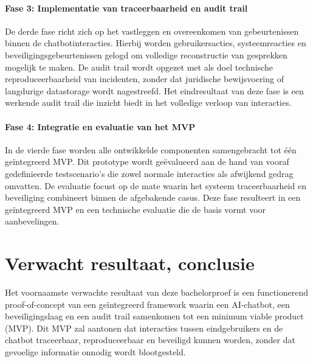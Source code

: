 \paragraph{Fase 3: Implementatie van traceerbaarheid en audit trail}
De derde fase richt zich op het vastleggen en overeenkomen van gebeurtenissen binnen de chatbotinteracties. Hierbij worden gebruikersacties, systeemreacties en beveiligingsgebeurtenissen gelogd om volledige reconstructie van gesprekken mogelijk te maken. De audit trail wordt opgezet met als doel technische reproduceerbaarheid van incidenten, zonder dat juridische bewijsvoering of langdurige datastorage wordt nagestreefd. Het eindresultaat van deze fase is een werkende audit trail die inzicht biedt in het volledige verloop van interacties.

\paragraph{Fase 4: Integratie en evaluatie van het MVP}
In de vierde fase worden alle ontwikkelde componenten samengebracht tot één geïntegreerd MVP. Dit prototype wordt geëvalueerd aan de hand van vooraf gedefinieerde testscenario’s die zowel normale interacties als afwijkend gedrag omvatten. De evaluatie focust op de mate waarin het systeem traceerbaarheid en beveiliging combineert binnen de afgebakende casus. Deze fase resulteert in een geïntegreerd MVP en een technische evaluatie die de basis vormt voor aanbevelingen.


\section{Verwacht resultaat, conclusie}%
\label{sec:verwachte_resultaten}

\noindent Het voornaamste verwachte resultaat van deze bachelorproef is een functionerend proof-of-concept van een geïntegreerd framework waarin een AI-chatbot, een beveiligingslaag en een audit trail samenkomen tot een minimum viable product (MVP). Dit MVP zal aantonen dat interacties tussen eindgebruikers en de chatbot traceerbaar, reproduceerbaar en beveiligd kunnen worden, zonder dat gevoelige informatie onnodig wordt blootgesteld.\\

